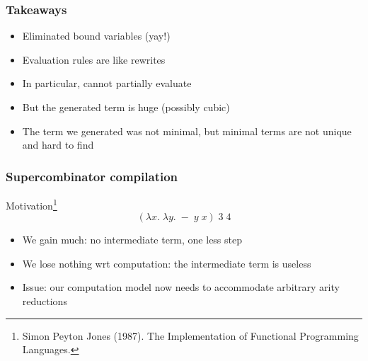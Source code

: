 \documentclass[aspectratio=1610, xcolor={dvipsnames}]{beamer}
\begin{document}
\begin{frame}
    \frametitle{Takeaways}


    \begin{itemize}[<+->]
        \item Eliminated bound variables (yay!)
        \item Evaluation rules are like rewrites
        \item In particular, cannot partially evaluate
        \item But the generated term is huge (possibly cubic)
        \item The term we generated was not minimal, but minimal terms are not
        unique and hard to find
    \end{itemize}




\end{frame}

\begin{frame}
    \frametitle{Supercombinator compilation}

    Motivation\footnote{Simon Peyton Jones (1987). The Implementation of Functional Programming Languages.}
    \begin{equation*}
        (\lambda x.\; \lambda y.\; - \;y \; x) \;3 \;4
    \end{equation*}
    \begin{itemize}[<+->]
        \item We gain much: no intermediate term, one less step
        \item We lose nothing wrt computation: the intermediate term is useless
        \item Issue: our computation model now needs to accommodate arbitrary arity reductions
    \end{itemize}

\end{frame}
\end{document}
